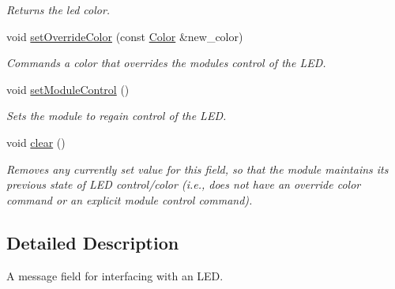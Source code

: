 \begin{DoxyCompactItemize}
\begin{DoxyCompactList}\small\item\em Returns the led color. \end{DoxyCompactList}\item 
void \hyperlink{classhebi_1_1Command_1_1LedField_aa1c2fc432de51dba198988b5c285d6a4}{set\+Override\+Color} (const \hyperlink{structhebi_1_1Color}{Color} \&new\+\_\+color)\hypertarget{classhebi_1_1Command_1_1LedField_aa1c2fc432de51dba198988b5c285d6a4}{}\label{classhebi_1_1Command_1_1LedField_aa1c2fc432de51dba198988b5c285d6a4}

\begin{DoxyCompactList}\small\item\em Commands a color that overrides the module\textquotesingle{}s control of the L\+ED. \end{DoxyCompactList}\item 
void \hyperlink{classhebi_1_1Command_1_1LedField_a3f41b8c7cc1d1de4fe3d78683be62ef0}{set\+Module\+Control} ()\hypertarget{classhebi_1_1Command_1_1LedField_a3f41b8c7cc1d1de4fe3d78683be62ef0}{}\label{classhebi_1_1Command_1_1LedField_a3f41b8c7cc1d1de4fe3d78683be62ef0}

\begin{DoxyCompactList}\small\item\em Sets the module to regain control of the L\+ED. \end{DoxyCompactList}\item 
void \hyperlink{classhebi_1_1Command_1_1LedField_aa0e2f2c914e83e8b60ca9da40474dc15}{clear} ()\hypertarget{classhebi_1_1Command_1_1LedField_aa0e2f2c914e83e8b60ca9da40474dc15}{}\label{classhebi_1_1Command_1_1LedField_aa0e2f2c914e83e8b60ca9da40474dc15}

\begin{DoxyCompactList}\small\item\em Removes any currently set value for this field, so that the module maintains its previous state of L\+ED control/color (i.\+e., does not have an override color command or an explicit \textquotesingle{}module control\textquotesingle{} command). \end{DoxyCompactList}\end{DoxyCompactItemize}


\subsection{Detailed Description}
A message field for interfacing with an L\+ED. 

